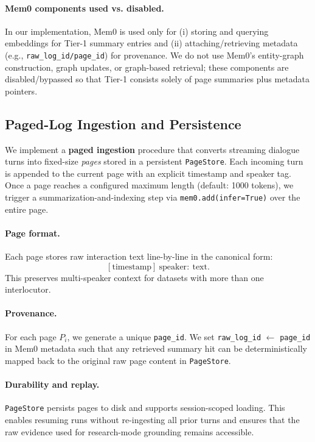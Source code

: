 \documentclass{article}
\theoremstyle{plain}
\theoremstyle{definition}
\theoremstyle{remark}
\begin{document}
\paragraph{Mem0 components used vs. disabled.}
In our implementation, Mem0 is used only for (i) storing and querying embeddings for Tier-1 summary entries and (ii) attaching/retrieving metadata (e.g., \texttt{raw\_log\_id/page\_id}) for provenance.
We do not use Mem0's entity-graph construction, graph updates, or graph-based retrieval; these components are disabled/bypassed so that Tier-1 consists solely of page summaries plus metadata pointers.

\subsection{Paged-Log Ingestion and Persistence}
\label{app:paged_log_ingestion}
We implement a \textbf{paged ingestion} procedure that converts streaming dialogue turns into fixed-size \emph{pages} stored in a persistent \texttt{PageStore}. Each incoming turn is appended to the current page with an explicit timestamp and speaker tag. Once a page reaches a configured maximum length (default: 1000 tokens), we trigger a summarization-and-indexing step via \texttt{mem0.add(infer=True)} over the entire page.

\paragraph{Page format.}
Each page stores raw interaction text line-by-line in the canonical form:
\[
[\text{timestamp}]~\text{speaker}:~\text{text}.
\]
This preserves multi-speaker context for datasets with more than one interlocutor.

\paragraph{Provenance.}
For each page $P_i$, we generate a unique \texttt{page\_id}. We set \texttt{raw\_log\_id} $\leftarrow$ \texttt{page\_id} in Mem0 metadata such that any retrieved summary hit can be deterministically mapped back to the original raw page content in \texttt{PageStore}.

\paragraph{Durability and replay.}
\texttt{PageStore} persists pages to disk and supports session-scoped loading. This enables resuming runs without re-ingesting all prior turns and ensures that the raw evidence used for research-mode grounding remains accessible.
\end{document}
